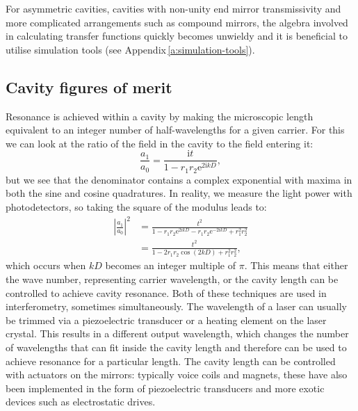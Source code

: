 For asymmetric cavities, cavities with non-unity end mirror transmissivity and more complicated arrangements such as compound mirrors, the algebra involved in calculating transfer functions quickly becomes unwieldy and it is beneficial to utilise simulation tools (see Appendix\,\ref{a:simulation-tools}).

\subsection{\label{sec:cavity-fom}Cavity figures of merit}
Resonance is achieved within a \FP{} cavity by making the microscopic length equivalent to an integer number of half-wavelengths for a given carrier. For this we can look at the ratio of the field in the cavity to the field entering it:
\begin{equation}
  \frac{a_1}{a_0} = \frac{\text{i} t}{1 - r_1 r_2 \text{e}^{2\text{i}kD}},
\end{equation}
but we see that the denominator contains a complex exponential with maxima in both the sine and cosine quadratures. In reality, we measure the light power with photodetectors, so taking the square of the modulus leads to:
\begin{equation}
  \begin{split}
    \left|\frac{a_1}{a_0}\right|^2 &= \frac{t^2}{1-r_1 r_2 \text{e}^{2\text{i}kD} - r_1 r_2 \text{e}^{-2\text{i}kD} + r_1^2 r_2^2} \\
                                   &= \frac{t^2}{1 - 2 r_1 r_2 \cos{\left( 2kD \right)} + r_1^2 r_2^2},
  \end{split}
\end{equation}
which occurs when $kD$ becomes an integer multiple of $\pi$. This means that either the wave number, representing carrier wavelength, or the cavity length can be controlled to achieve cavity resonance. Both of these techniques are used in interferometry, sometimes simultaneously. The wavelength of a laser can usually be trimmed via a piezoelectric transducer or a heating element on the laser crystal. This results in a different output wavelength, which changes the number of wavelengths that can fit inside the cavity length and therefore can be used to achieve resonance for a particular length. The cavity length can be controlled with actuators on the mirrors: typically voice coils and magnets, these have also been implemented in the form of piezoelectric transducers and more exotic devices such as electrostatic drives.

